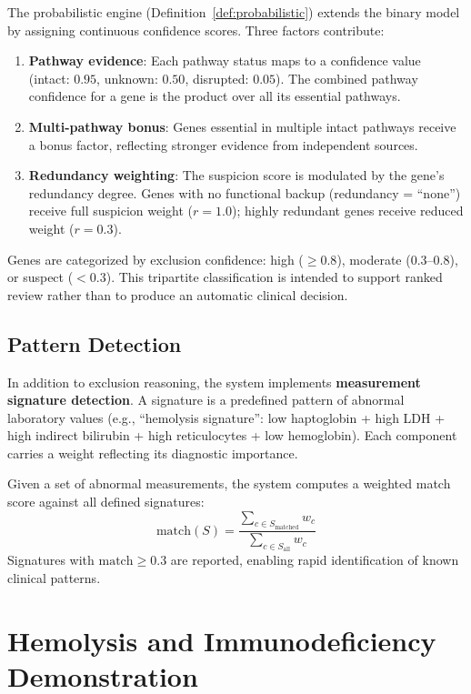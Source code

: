 \documentclass[12pt,a4paper]{article}
\begin{document}
The probabilistic engine (Definition~\ref{def:probabilistic}) extends the binary model by assigning continuous confidence scores. Three factors contribute:

\begin{enumerate}
    \item \textbf{Pathway evidence}: Each pathway status maps to a confidence value (intact: $0.95$, unknown: $0.50$, disrupted: $0.05$). The combined pathway confidence for a gene is the product over all its essential pathways.
    \item \textbf{Multi-pathway bonus}: Genes essential in multiple intact pathways receive a bonus factor, reflecting stronger evidence from independent sources.
    \item \textbf{Redundancy weighting}: The suspicion score is modulated by the gene's redundancy degree. Genes with no functional backup (redundancy = ``none'') receive full suspicion weight ($r = 1.0$); highly redundant genes receive reduced weight ($r = 0.3$).
\end{enumerate}

Genes are categorized by exclusion confidence: high ($\geq 0.8$), moderate ($0.3$--$0.8$), or suspect ($< 0.3$). This tripartite classification is intended to support ranked review rather than to produce an automatic clinical decision.

\subsection{Pattern Detection}

In addition to exclusion reasoning, the system implements \textbf{measurement signature detection}. A signature is a predefined pattern of abnormal laboratory values (e.g., ``hemolysis signature'': low haptoglobin + high LDH + high indirect bilirubin + high reticulocytes + low hemoglobin). Each component carries a weight reflecting its diagnostic importance.

Given a set of abnormal measurements, the system computes a weighted match score against all defined signatures:
\begin{equation}
    \text{match}(S) = \frac{\sum_{c \in S_{\text{matched}}} w_c}{\sum_{c \in S_{\text{all}}} w_c}
\end{equation}
Signatures with $\text{match} \geq 0.3$ are reported, enabling rapid identification of known clinical patterns.

\section{Hemolysis and Immunodeficiency Demonstration}
\label{sec:demo}
\end{document}
